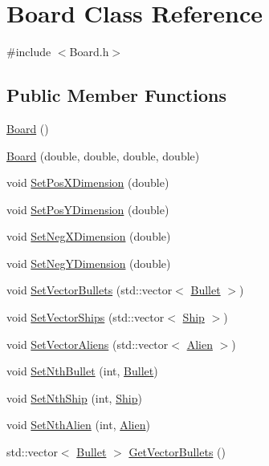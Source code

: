 \hypertarget{classBoard}{\section{Board Class Reference}
\label{classBoard}
}


{\ttfamily \#include $<$Board.\-h$>$}

\subsection*{Public Member Functions}
\begin{DoxyCompactItemize}
\item 
\hyperlink{classBoard_a9ee491d4fea680cf69b033374a9fdfcb}{Board} ()
\item 
\hyperlink{classBoard_a165433da04a8e74a38f12ac2e6bd427b}{Board} (double, double, double, double)
\item 
void \hyperlink{classBoard_a1f3179789d0cdd0693afe8d86231fefa}{Set\-Pos\-X\-Dimension} (double)
\item 
void \hyperlink{classBoard_a3ff5a920c5654a71ce0b5ca746c7c7bb}{Set\-Pos\-Y\-Dimension} (double)
\item 
void \hyperlink{classBoard_a502ea2921d60cd7070a7b09113d29c98}{Set\-Neg\-X\-Dimension} (double)
\item 
void \hyperlink{classBoard_a76e94bf8cf5c9608d0029bd7a48e849e}{Set\-Neg\-Y\-Dimension} (double)
\item 
void \hyperlink{classBoard_a54d9866ac96c6cd290bf33ed20f47b40}{Set\-Vector\-Bullets} (std\-::vector$<$ \hyperlink{classBullet}{Bullet} $>$)
\item 
void \hyperlink{classBoard_a06eb221dbe45442ff706bdbb9e16b5ed}{Set\-Vector\-Ships} (std\-::vector$<$ \hyperlink{classShip}{Ship} $>$)
\item 
void \hyperlink{classBoard_a1aa91f30ab80521b99633a475065ff2e}{Set\-Vector\-Aliens} (std\-::vector$<$ \hyperlink{classAlien}{Alien} $>$)
\item 
void \hyperlink{classBoard_a4ed848f226c934b1b01e42beeeba0df2}{Set\-Nth\-Bullet} (int, \hyperlink{classBullet}{Bullet})
\item 
void \hyperlink{classBoard_a0a547801e0b52fc2dc8ec1875b4c2281}{Set\-Nth\-Ship} (int, \hyperlink{classShip}{Ship})
\item 
void \hyperlink{classBoard_a14c341a116fe5a799d32e6a1a2ad20ee}{Set\-Nth\-Alien} (int, \hyperlink{classAlien}{Alien})
\item 
std\-::vector$<$ \hyperlink{classBullet}{Bullet} $>$ \hyperlink{classBoard_a668fa377b810b29a26f2e2b6ae140884}{Get\-Vector\-Bullets} ()

\end{DoxyCompactItemize}
